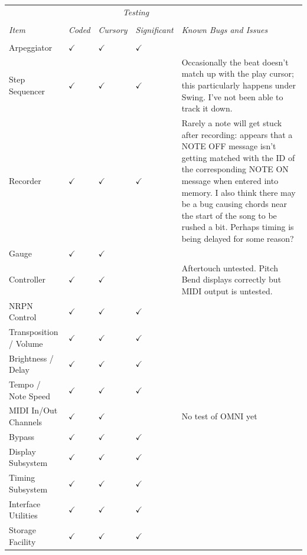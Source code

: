 \documentclass{article}
\begin{document}
\begin{center}
{
\setlength\extrarowheight{0.3em}
\begin{tabular}{@{}llllp{2.8in}@{}}
&&\multicolumn{2}{c}{\it Testing}&\\[0.1em]
\cline{3-4}\\[-0.9em]
{\it Item} & {\it Coded} & {\it Cursory} & {\it Significant} & {\it Known Bugs and Issues}\\[0.1em]
		\hline\\[-1.5em]
Arpeggiator& $\checkmark$ & $\checkmark$ & $\checkmark$  & \\
Step Sequencer& $\checkmark$ & $\checkmark$ & $\checkmark$ & Occasionally the beat doesn't match up with the play cursor; this particularly happens under Swing.  I've not been able to track it down.\\
Recorder& $\checkmark$ & $\checkmark$ & $\checkmark$ & Rarely a note will get stuck after recording: appears that a NOTE OFF message isn't getting matched with the ID of the corresponding NOTE ON message when entered into memory.  
I also think there may be a bug causing chords near the start of the song to be rushed a bit.  Perhaps timing is being delayed for some reason?\\
Gauge& $\checkmark$ & $\checkmark$ &\\ 
Controller& $\checkmark$ & $\checkmark$ & & Aftertouch untested.  Pitch Bend displays correctly but MIDI output is untested.\\ 
NRPN Control  &  $\checkmark$ & $\checkmark$ &  $\checkmark$ &\\
Transposition / Volume  &  $\checkmark$ & $\checkmark$ &  $\checkmark$ &\\
Brightness / Delay  &  $\checkmark$ & $\checkmark$ &  $\checkmark$ &\\
Tempo / Note Speed &  $\checkmark$ & $\checkmark$ &  $\checkmark$ &\\
MIDI In/Out Channels &  $\checkmark$ & $\checkmark$ &  & No test of OMNI yet\\
Bypass &  $\checkmark$ & $\checkmark$ &  $\checkmark$ &\\
Display Subsystem  &  $\checkmark$ & $\checkmark$ &  $\checkmark$ &\\
Timing  Subsystem &  $\checkmark$ & $\checkmark$ &  $\checkmark$ &\\
Interface Utilities &  $\checkmark$ & $\checkmark$ &  $\checkmark$ & \\
Storage Facility &  $\checkmark$ & $\checkmark$ &  $\checkmark$ &\\

\end{tabular}}
\end{center}
\end{document}
